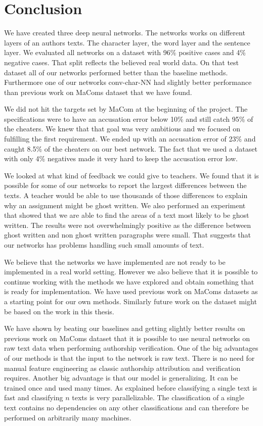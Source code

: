 \section{Conclusion} \label{sec:conclusion}

We have created three deep neural networks. The networks works on different
layers of an authors texts. The character layer, the word layer and the sentence
layer. We evaluated all networks on a dataset with 96\% positive cases and
4\% negative cases. That split reflects the believed real world data. On
that test dataset all of our networks performed better than the baseline
methods. Furthermore one of our networks \gls{conv-char-NN} had slightly better
performance than previous work on MaComs dataset that we have found.

We did not hit the targets set by MaCom at the beginning of the project. The
specifications were to have an accusation error below 10\% and still catch 95\%
of the cheaters. We knew that that goal was very ambitious and we focused on
fulfilling the first requirement. We ended up with an accusation error of 23\%
and caught 8.5\% of the cheaters on our best network. The fact that we used a
dataset with only 4\% negatives made it very hard to keep the accusation error
low.

We looked at what kind of feedback we could give to teachers. We found that it
is possible for some of our networks to report the largest differences between
the texts. A teacher would be able to use thousands of those differences
to explain why an assignment might be ghost written. We also performed an
experiment that showed that we are able to find the areas of a text most likely
to be ghost written. The results were not overwhelmingly positive as the
difference between ghost written and non ghost written paragraphs were small.
That suggests that our networks has problems handling such small amounts of
text.

We believe that the networks we have implemented are not ready to be implemented
in a real world setting. However we also believe that it is possible to continue
working with the methods we have explored and obtain something that is ready for
implementation. We have used previous work on MaComs datasets as a starting
point for our own methods. Similarly future work on the dataset might be based
on the work in this thesis.

We have shown by beating our baselines and getting slightly better results on
previous work on MaComs dataset that it is possible to use neural networks
on raw text data when performing authorship verification. One of the big
advantages of our methods is that the input to the network is raw text. There
is no need for manual feature engineering as classic authorship attribution and
verification requires. Another big advantage is that our model is generalizing.
It can be trained once and used many times. As explained before classifying
a single text is fast and classifying $n$ texts is very parallelizable.
The classification of a single text contains no dependencies on any other
classifications and can therefore be performed on arbitrarily many machines.
